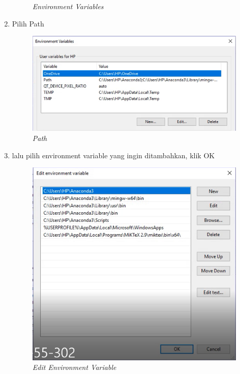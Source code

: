 \begin{enumerate}
\begin{figure}[H]
    \caption{\textit{Environment Variables}}
    \label{Environment3}
\end{figure}
\item Pilih Path
\begin{figure}[H]
    \centering
    \includegraphics[scale=0.7]{figures/path}
    \caption{\textit{Path}}
    \label{Environment4}
\end{figure}
\item lalu pilih environment variable yang ingin ditambahkan, klik OK
\begin{figure}[H]
    \centering
    \includegraphics[scale=0.7]{figures/ok}
    \caption{\textit{Edit Environment Variable}}
    \label{Environment5}
\end{figure}
\end{enumerate}

